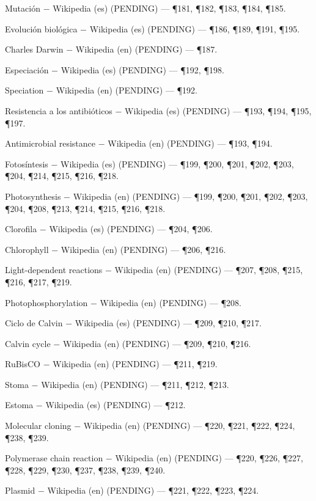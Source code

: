 \documentclass{book}
\begin{document}
\noindent Mutación \(-\) Wikipedia (es) (PENDING) --- \P181, \P182, \P183, \P184, \P185.

\noindent Evolución biológica \(-\) Wikipedia (es) (PENDING) --- \P186, \P189, \P191, \P195.

\noindent Charles Darwin \(-\) Wikipedia (en) (PENDING) --- \P187.

\noindent Especiación \(-\) Wikipedia (es) (PENDING) --- \P192, \P198.

\noindent Speciation \(-\) Wikipedia (en) (PENDING) --- \P192.

\noindent Resistencia a los antibióticos \(-\) Wikipedia (es) (PENDING) --- \P193, \P194, \P195, \P197.

\noindent Antimicrobial resistance \(-\) Wikipedia (en) (PENDING) --- \P193, \P194.

\noindent Fotosíntesis \(-\) Wikipedia (es) (PENDING) --- \P199, \P200, \P201, \P202, \P203, \P204, \P214, \P215, \P216, \P218.

\noindent Photosynthesis \(-\) Wikipedia (en) (PENDING) --- \P199, \P200, \P201, \P202, \P203, \P204, \P208, \P213, \P214, \P215, \P216, \P218.

\noindent Clorofila \(-\) Wikipedia (es) (PENDING) --- \P204, \P206.

\noindent Chlorophyll \(-\) Wikipedia (en) (PENDING) --- \P206, \P216.

\noindent Light-dependent reactions \(-\) Wikipedia (en) (PENDING) --- \P207, \P208, \P215, \P216, \P217, \P219.

\noindent Photophosphorylation \(-\) Wikipedia (en) (PENDING) --- \P208.

\noindent Ciclo de Calvin \(-\) Wikipedia (es) (PENDING) --- \P209, \P210, \P217.

\noindent Calvin cycle \(-\) Wikipedia (en) (PENDING) --- \P209, \P210, \P216.

\noindent RuBisCO \(-\) Wikipedia (en) (PENDING) --- \P211, \P219.

\noindent Stoma \(-\) Wikipedia (en) (PENDING) --- \P211, \P212, \P213.

\noindent Estoma \(-\) Wikipedia (es) (PENDING) --- \P212.

\noindent Molecular cloning \(-\) Wikipedia (en) (PENDING) --- \P220, \P221, \P222, \P224, \P238, \P239.

\noindent Polymerase chain reaction \(-\) Wikipedia (en) (PENDING) --- \P220, \P226, \P227, \P228, \P229, \P230, \P237, \P238, \P239, \P240.

\noindent Plasmid \(-\) Wikipedia (en) (PENDING) --- \P221, \P222, \P223, \P224.
\end{document}
